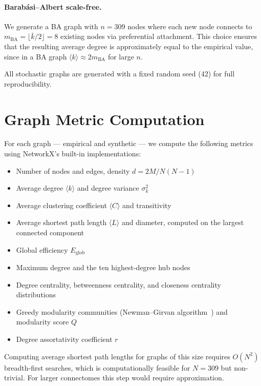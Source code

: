 \documentclass[12pt,a4paper]{report}
\begin{document}
\paragraph{Barab\'{a}si--Albert scale-free.} We generate a BA graph with $n = 309$ nodes where each new node connects to $m_{\text{BA}} = \lfloor \bar{k}/2 \rfloor = 8$ existing nodes via preferential attachment. This choice ensures that the resulting average degree is approximately equal to the empirical value, since in a BA graph $\langle k \rangle \approx 2 m_{\text{BA}}$ for large $n$.

All stochastic graphs are generated with a fixed random seed (42) for full reproducibility.

\section{Graph Metric Computation}

For each graph — empirical and synthetic — we compute the following metrics using NetworkX's built-in implementations:

\begin{itemize}
    \item Number of nodes and edges, density $d = 2M / N(N-1)$
    \item Average degree $\langle k \rangle$ and degree variance $\sigma^2_k$
    \item Average clustering coefficient $\langle C \rangle$ and transitivity
    \item Average shortest path length $\langle L \rangle$ and diameter, computed on the largest connected component
    \item Global efficiency $E_{\text{glob}}$ \cite{latora2001efficient}
    \item Maximum degree and the ten highest-degree hub nodes
    \item Degree centrality, betweenness centrality, and closeness centrality distributions
    \item Greedy modularity communities (Newman--Girvan algorithm~\cite{girvan2002community}) and modularity score $Q$
    \item Degree assortativity coefficient $r$
\end{itemize}

Computing average shortest path lengths for graphs of this size requires $O(N^2)$ breadth-first searches, which is computationally feasible for $N = 309$ but non-trivial. For larger connectomes this step would require approximation.
\end{document}
